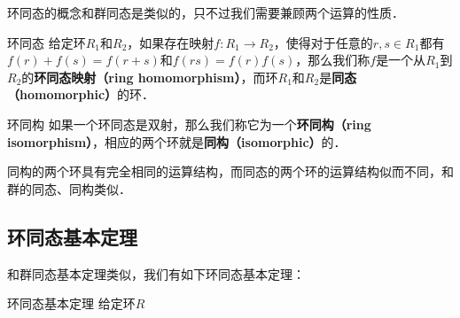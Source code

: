 

环同态的概念和群同态是类似的，只不过我们需要兼顾两个运算的性质．


\begin{definition}{环同态}
给定环$R_1$和$R_2$，如果存在映射$f:R_1\rightarrow R_2$，使得对于任意的$r, s\in R_1$都有$f(r)+f(s)=f(r+s)$和$f(rs)=f(r)f(s)$，那么我们称$f$是一个从$R_1$到$R_2$的\textbf{环同态映射（ring homomorphism）}，而环$R_1$和$R_2$是\textbf{同态（homomorphic）}的环．
\end{definition}

\begin{definition}{环同构}
如果一个环同态是双射，那么我们称它为一个\textbf{环同构（ring isomorphism）}，相应的两个环就是\textbf{同构（isomorphic）}的．
\end{definition}

同构的两个环具有完全相同的运算结构，而同态的两个环的运算结构似而不同，和群的同态、同构类似．

\subsection{环同态基本定理}

和群同态基本定理类似，我们有如下环同态基本定理：

\begin{definition}{环同态基本定理}
给定环$R$
\end{definition}





